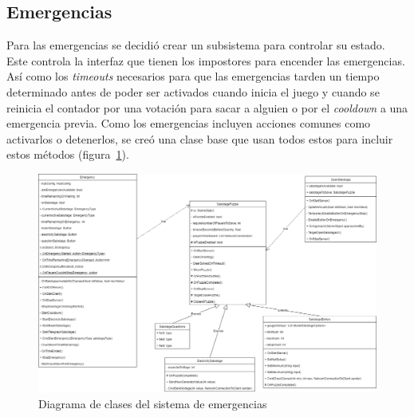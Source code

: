 \subsection{Emergencias}
Para las emergencias se decidió crear un subsistema para controlar su estado. Este controla la interfaz que tienen los impostores para encender las emergencias. Así como los \textit{timeouts} necesarios para que las emergencias tarden un tiempo determinado antes de poder ser activados cuando inicia el juego y cuando se reinicia el contador por una votación para sacar a alguien o por el \textit{cooldown} a una emergencia previa.
Como los emergencias incluyen acciones comunes como activarlos o detenerlos, se creó una clase base que usan todos estos para incluir estos métodos (figura~\ref{fig:diagrama_clases_emergencias}).
\begin{figure}[h]
    \centering
    \includegraphics[width=1\linewidth]{images/DiagramaClasesEmergencias.png}
    \caption{Diagrama de clases del sistema de emergencias}
    \label{fig:diagrama_clases_emergencias}
\end{figure}
